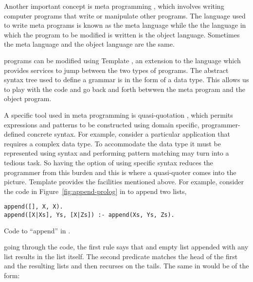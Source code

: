 \documentclass[thesis-solanki.tex]{subfiles}
\begin{document}
Another important concept is meta programming \cite{website:metaprogwiki}, which involves writing computer programs
that write or manipulate other programs.
The language used to write meta programs is known as the meta language while the the language in which the program
to be modified is written is the object language.
Sometimes the meta language and the object language are the same.

 programs can be modified using Template  \cite{website:templatehaskell}, an
extension to the language which provides services to jump between the two types of programs.
The abstract syntax tree used to define a grammar is in the form of a  data type. This allows us to play with the code and go back and forth betwwen the meta program and the object program.

A specific tool used in meta programming is quasi-quotation \cite{mainland2007s,haskellquasi,wikiquasi}, which
permits  expressions and patterns to be constructed using domain specific,
pro\-gram\-mer-de\-fined concrete syntax.
For example, consider a particular application that requires a complex data type.
To accommodate the data type it must be represented
using  syntax and performing pattern matching may turn into a tedious task.
So having the option of using specific syntax reduces the programmer from this burden and this is where a
quasi-quoter comes into the picture.
Template  provides the facilities mentioned above.
For example, consider the code in Figure~\ref{fig:append-prolog}
in  to append two lists,
\begin{code-list}[h]
\begin{verbatim}
append([], X, X).
append([X|Xs], Ys, [X|Zs]) :- append(Xs, Ys, Zs).
\end{verbatim}    
\vspace*{-0.8\baselineskip}
\caption{Code to ``append'' in \protect{}.}
\label{fig:append-prolog}
\end{code-list}
going through the code, the first rule says that and empty list appended with any list results in the list itself.
The second predicate matches the head of the first and the resulting lists and then recurses on the tails.
The same in  would be of the form:
\end{document}
